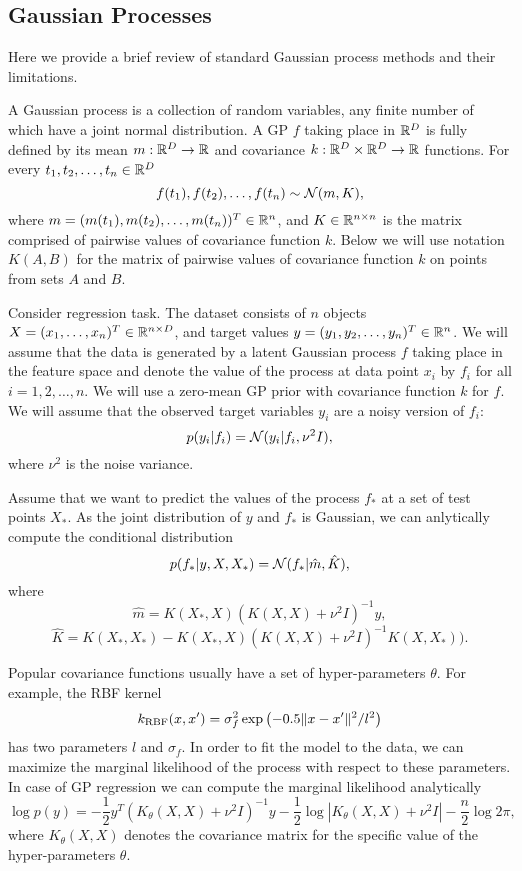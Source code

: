 \subsection{Gaussian Processes}
  Here we provide a brief review of standard Gaussian process methods and their
  limitations.

  A Gaussian process is a collection of random variables, any finite number of
  which have a joint normal distribution. A GP $f$ taking place in $\mathbb{R}^D$ is
  fully defined by its mean $m: \mathbb{R}^D \rightarrow \mathbb{R}$ and covariance
  $k: \mathbb{R}^D \times \mathbb{R}^D \rightarrow \mathbb{R}$ functions. For every $t_1, t_2, \ldots, t_n \in \mathbb{R}^D$
  \[
    f(t_1), f(t_2), \ldots, f(t_n) \sim \mathcal{N}(m, K),
  \]
  where $m = (m(t_1), m(t_2), \ldots, m(t_n))^T \in \mathbb{R}^n$, and
  $K\in \mathbb{R}^{n \times n}$ is the matrix comprised of pairwise values of covariance
  function $k$. Below we will use notation $K(A, B)$ for the matrix of pairwise
  values of covariance function $k$ on points from sets $A$ and $B$.

  Consider regression task. The dataset  consists of
  $n$ objects $X = (x_1, \ldots, x_n)^T \in \mathbb{R}^{n \times D}$, and target values
  $y = (y_1, y_2, \ldots, y_n)^T \in \mathbb{R}^n$. We will assume that the data is
  generated by a latent Gaussian process $f$ taking place in the feature space
  and denote the value of the process at data point $x_i$ by $f_i$ for all
  $i = 1, 2, \ldots, n$. We will use a zero-mean GP prior with covariance function
  $k$ for $f$. We will assume that the observed target variables $y_i$
  are a noisy version of $f_i$:
  \[
    p(y_i | f_i) = \mathcal{N}(y_i | f_i, \nu^2 I),
  \]
  where $\nu^2$ is the noise variance.

  Assume that we want to predict the values of the process $f_*$ at a set of test
  points
  $X_*$. As the joint distribution of $y$ and $f_*$ is Gaussian, we can anlytically
  compute the conditional distribution
  \[
    p(f_* | y, X, X_*) = \mathcal{N}(f_* | \hat m, \hat K),
  \]
  where
  \[
      \hat m = K(X_*, X) (K(X, X) + \nu^2 I)^{-1} y,
  \]
  \[
      \hat K = K(X_*, X_*) - K(X_*, X)(K(X, X) + \nu^2 I)^{-1} K(X, X_*)).
  \]

  Popular covariance functions usually have a set of hyper-parameters $\theta$.
  For example, the RBF kernel
  \[
    k_{\mbox{\scriptsize RBF}} (x, x') = \sigma_f^2 \exp\left(- 0.5 \Vert x - x'\Vert^2 / l^2 \right)
  \]
  has two parameters $l$ and $\sigma_f$. In order to fit the model to the data,
  we can maximize the marginal likelihood of the process with respect to these
  parameters. In case of GP regression we can compute the marginal likelihood
  analytically
  \[
    \log p(y) = -\frac 1 2 y^T (K_{\theta}(X, X) + \nu^2 I)^{-1} y -
    \frac 1 2 \log |K_{\theta} (X, X) + \nu^2 I| - \frac n 2 \log 2 \pi,
  \]
  where $K_{\theta}(X, X)$ denotes the covariance matrix for the specific
  value of the hyper-parameters $\theta$.

